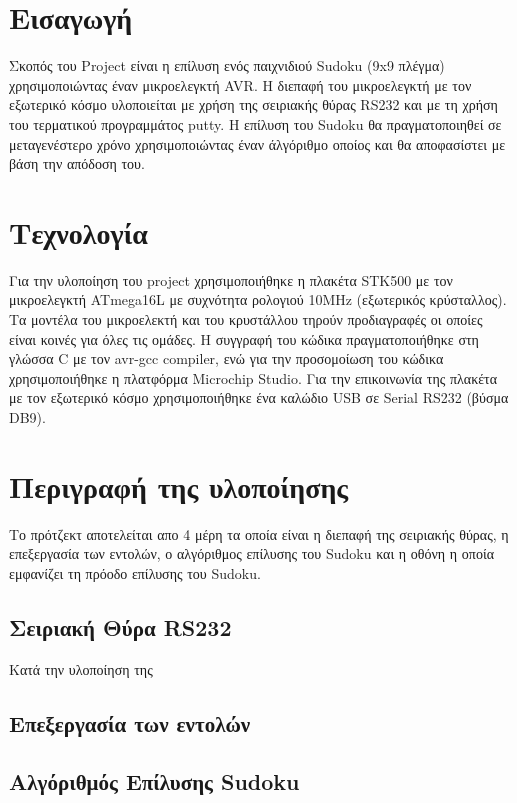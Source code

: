 \documentclass[a4paper,12pt]{article}
\begin{document}


\newpage
\tableofcontents
\newpage

\section{Εισαγωγή}
Σκοπός του Project είναι η επίλυση ενός παιχνιδιού Sudoku (9x9 πλέγμα) χρησιμοποιώντας έναν μικροελεγκτή AVR. Η διεπαφή του μικροελεγκτή με τον εξωτερικό κόσμο υλοποιείται με χρήση της σειριακής θύρας RS232 και με τη χρήση του τερματικού προγραμμάτος putty. Η επίλυση του Sudoku θα πραγματοποιηθεί σε μεταγενέστερο χρόνο χρησιμοποιώντας έναν άλγόριθμο οποίος και θα αποφασίστει με βάση την απόδοση του.

\section{Τεχνολογία}
Για την υλοποίηση του project χρησιμοποιήθηκε η πλακέτα STK500 με τον μικροελεγκτή ATmega16L με συχνότητα ρολογιού 10MHz (εξωτερικός κρύσταλλος). Τα μοντέλα του μικροελεκτή και του κρυστάλλου τηρούν προδιαγραφές οι οποίες είναι κοινές για όλες τις ομάδες. Η συγγραφή του κώδικα πραγματοποιήθηκε στη γλώσσα C με τον avr-gcc compiler, ενώ για την προσομοίωση του κώδικα χρησιμοποιήθηκε η πλατφόρμα Microchip Studio. Για την επικοινωνία της πλακέτα με τον εξωτερικό κόσμο χρησιμοποιήθηκε ένα καλώδιο USB σε Serial RS232 (βύσμα DB9).   


\section{Περιγραφή της υλοποίησης}
Το πρότζεκτ αποτελείται απο 4 μέρη τα οποία είναι η διεπαφή της σειριακής θύρας, η επεξεργασία των εντολών, ο αλγόριθμος επίλυσης του Sudoku και η οθόνη η οποία εμφανίζει τη πρόοδο επίλυσης του Sudoku. 

\subsection{Σειριακή Θύρα RS232}
Κατά την υλοποίηση της 

\subsection{Επεξεργασία των εντολών}

\subsection{Αλγόριθμός Επίλυσης Sudoku}
\end{document}
